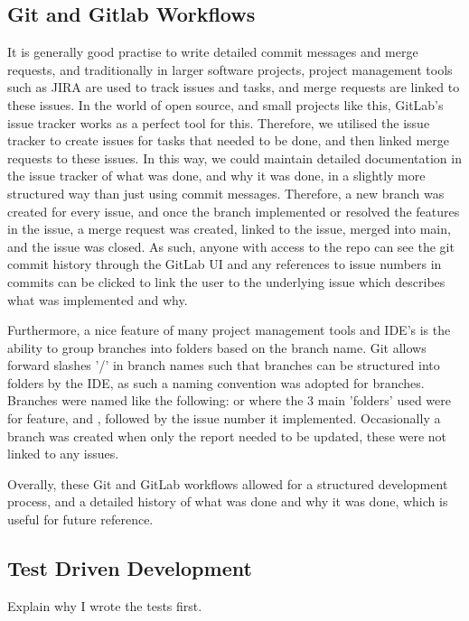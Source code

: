     \subsection{Git and Gitlab Workflows}\label{subsec:git-and-gitlab-pipeline}
    It is generally good practise to write detailed commit messages and merge requests, and traditionally in larger
    software projects, project management tools such as JIRA are used to track issues and tasks, and merge requests
    are linked to these issues.
    In the world of open source, and small projects like this, GitLab's issue tracker works as a perfect tool for this.
    Therefore, we utilised the issue tracker to create issues for tasks that needed to be done, and then linked merge requests
    to these issues.
    In this way, we could maintain detailed documentation in the issue tracker of what was done, and why it was done,
    in a slightly more structured way than just using commit messages.
    Therefore, a new branch was created for every issue, and once the branch implemented or resolved the features in the
    issue, a merge request was created, linked to the issue, merged into main, and the issue was closed.
    As such, anyone with access to the repo can see the git commit history through the GitLab UI and any references to issue
    numbers in commits can be clicked to link the user to the underlying issue which describes what was implemented and why.

    Furthermore, a nice feature of many project management tools and IDE's is the ability to group branches into folders
    based on the branch name.
    Git allows forward slashes '/' in branch names such that branches can be structured into folders by the IDE, as such
    a naming convention was adopted for branches.
    Branches were named like the following:  or  where the 3 main
    'folders' used were  for feature,  and , followed by
    the issue number it implemented.
    Occasionally a  branch was created when only the report needed to be updated, these were not linked
    to any issues.

    Overally, these Git and GitLab workflows allowed for a structured development process, and a detailed history of
    what was done and why it was done, which is useful for future reference.

    \subsection{Test Driven Development}\label{subsec:test-driven-development}
    Explain why I wrote the tests first.

